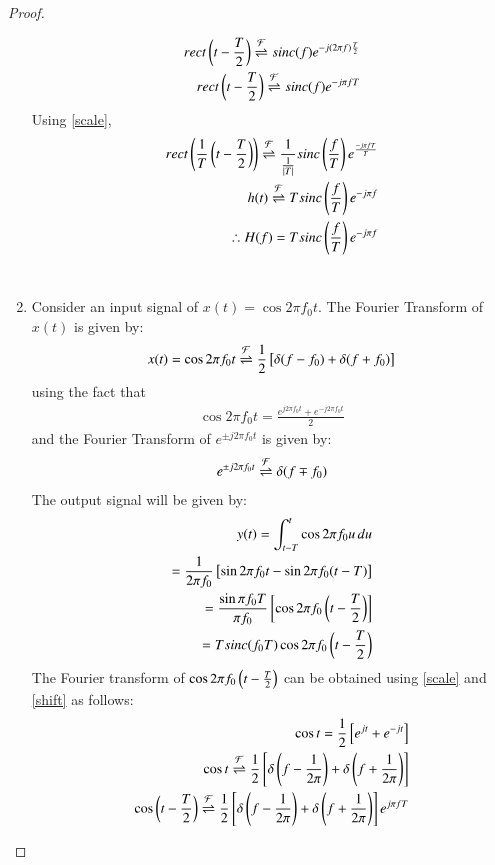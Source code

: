 \documentclass[journal,12pt,twocolumn]{IEEEtran}
\begin{document}
\begin{proof}
\begin{enumerate}
\begin{align}
    rect\left(t - \frac{T}{2}\right) \overset{\mathcal{F}}{ \rightleftharpoons} sinc( f)e^{-j(2 \pi f)\frac{T}{2}}\\
    rect\left(t - \frac{T}{2}\right) \overset{\mathcal{F}}{ \rightleftharpoons} sinc( f)e^{-j \pi f T}
\end{align}
Using \eqref{scale},
\begin{align}
    rect\left(\frac{1}{T}\left(t - \frac{T}{2}\right)\right) \overset{\mathcal{F}}{ \rightleftharpoons} \frac{1}{\frac{1}{\left\vert T\right\vert}}sinc\left(\frac{ f }{T}\right)e^{\frac{-j \pi f T}{T}}\\
    h(t) \overset{\mathcal{F}}{ \rightleftharpoons} Tsinc\left(\frac{ f }{T}\right)e^{-j\pi f}\\
    \therefore H(f)  = Tsinc\left(\frac{ f }{T}\right)e^{-j\pi f}
\end{align}\\


\item Consider an input signal of $x(t) = \cos{2\pi f_0t}$. The Fourier Transform of $x(t)$ is given by:
\begin{align}
    x(t) = \cos{2\pi f_0t} \overset{\mathcal{F}}{ \rightleftharpoons} \frac{1}{2}{}\left[\delta(f - f_0) + \delta(f + f_0)\right]
\end{align}
using the fact that 
\begin{align}
    \cos{2\pi f_0 t} = \frac{e^{j2\pi f_0 t} + e^{-j2\pi f_0 t}}{2}
\end{align} and the Fourier Transform of $e^{\pm j2\pi f_0 t}$ is given by:
\begin{align}
    e^{\pm j2\pi  f_0 t} \overset{\mathcal{F}}{ \rightleftharpoons} \delta(f \mp f_0)
    \label{FT}
\end{align}
The output signal will be given by:
\begin{align}
    y(t) = \int_{t-T}^t \cos{2\pi f_0u}\,du\\
     = \frac{1}{2\pi f_0}{}\left[\sin{2\pi f_0t}- \sin2\pi f_0({t-T})\right]\\
      = \frac{\sin\pi f_0 T}{\pi f_0} {}\left[\cos2\pi f_0 \left(t - \frac{T}{2}\right)\right]\\
      = Tsinc(f_0 T)\cos2\pi f_0\left(t - \frac{T}{2}\right)
      \label{output}
\end{align}
The Fourier transform of $\cos2\pi f_0\left(t - \frac{T}{2}\right)$ can be obtained using \eqref{scale} and \eqref{shift} as follows:
\small{
\begin{align}
    \cos t = \frac{1}{2}\sbrak{e^{jt} + e^{-jt}}\\
    \cos t \fourier \frac{1}{2}\sbrak{\delta\brak{f - \frac{1}{2\pi}} + \delta\brak{f + \frac{1}{2\pi}}}\\
    \cos\brak{t - \frac{T}{2}} \fourier \frac{1}{2}\sbrak{\delta\brak{f - \frac{1}{2\pi}} + \delta\brak{f + \frac{1}{2\pi}}} e^{j\pi fT}\\

\end{align}}
\end{enumerate}
\end{proof}
\end{document}
